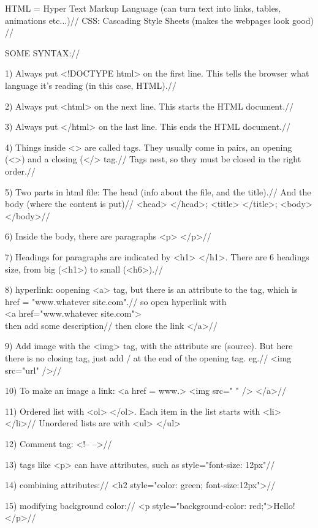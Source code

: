\documentclass[12pts]{article}
\begin{document}
HTML = Hyper Text Markup Language (can turn text into links, tables, animations
       etc...)//
CSS: Cascading Style Sheets (makes the webpages look good)
//

SOME SYNTAX://

1) Always put <!DOCTYPE html> on the first line. This tells the browser what language it's reading (in this case, HTML).//

2) Always put <html> on the next line. This starts the HTML document.//

3) Always put <\slash html> on the last line. This ends the HTML document.//

4) Things inside <> are called tags. They usually come in pairs, an opening (<>)
   and a closing (<\slash> tag.//
   Tags nest, so they must be closed in the right order.//

5) Two parts in html file: The head (info about the file, and the title).//
   And the body (where the content is put)//
   <head> <\slash head>; <title> <\slash title>; <body> <\slash body>//

6) Inside the body, there are paragraphs <p> <\slash p>//

7) Headings for paragraphs are indicated by <h1> <\slash h1>. There are 6 headings size, from big (<h1>) to small (<h6>).//

8) hyperlink: oopening <a> tag, but there is an attribute to the tag, which is\\
   href = "www.whatever site.com".//
   so open hyperlink with\\ 
   <a href="www.whatever site.com">\\
   then add some description//
   then close the link <\slash a>//

9) Add image with the <img> tag, with the attribute src (source). But here
   there is no closing tag, just add / at the end of the opening tag. eg.//
   <img src="url" \slash>//

10) To make an image a link: <a href = www.> <img src=" " \slash> <\slash a>//

11) Ordered list with <ol> </ol>. Each item in the list starts with
    <li> </li>//
    Unordered lists are with <ul> </ul>

12) Comment tag: <!--   -->//

13) tags like <p> can have attributes, such as style="font-size: 12px"//

14) combining attributes://
    <h2 style="color: green; font-size:12px">//

15) modifying background color://
<p style="background-color: red;">Hello!</p>//
\end{document}
